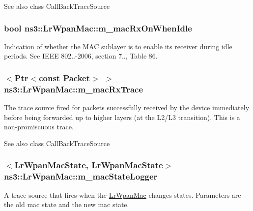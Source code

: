 \begin{DoxySeeAlso}{See also}
class Call\+Back\+Trace\+Source 
\end{DoxySeeAlso}
\subsubsection[{\texorpdfstring{m\+\_\+mac\+Rx\+On\+When\+Idle}{m_macRxOnWhenIdle}}]{\setlength{\rightskip}{0pt plus 5cm}bool ns3\+::\+Lr\+Wpan\+Mac\+::m\+\_\+mac\+Rx\+On\+When\+Idle}\hypertarget{classns3_1_1LrWpanMac_a0e100f9e642d0adce0e0a29384c535fc}{}\label{classns3_1_1LrWpanMac_a0e100f9e642d0adce0e0a29384c535fc}
Indication of whether the M\+AC sublayer is to enable its receiver during idle periods. See I\+E\+EE 802..-\/2006, section 7.., Table 86. 
\subsubsection[{\texorpdfstring{m\+\_\+mac\+Rx\+Trace}{m_macRxTrace}}]{$<${\bf Ptr}$<$const {\bf Packet}$>$ $>$ ns3\+::\+Lr\+Wpan\+Mac\+::m\+\_\+mac\+Rx\+Trace\hspace{0.3cm}{\ttfamily [private]}}\hypertarget{classns3_1_1LrWpanMac_a38183ee976b61d2c93942250f5670b7c}{}\label{classns3_1_1LrWpanMac_a38183ee976b61d2c93942250f5670b7c}
The trace source fired for packets successfully received by the device immediately before being forwarded up to higher layers (at the L2/\+L3 transition). This is a non-\/promiscuous trace.

\begin{DoxySeeAlso}{See also}
class Call\+Back\+Trace\+Source 
\end{DoxySeeAlso}
\subsubsection[{\texorpdfstring{m\+\_\+mac\+State\+Logger}{m_macStateLogger}}]{$<${\bf Lr\+Wpan\+Mac\+State}, {\bf Lr\+Wpan\+Mac\+State}$>$ ns3\+::\+Lr\+Wpan\+Mac\+::m\+\_\+mac\+State\+Logger\hspace{0.3cm}{\ttfamily [private]}}\hypertarget{classns3_1_1LrWpanMac_a7545ecfb4bdf7436739d00507872d248}{}\label{classns3_1_1LrWpanMac_a7545ecfb4bdf7436739d00507872d248}
A trace source that fires when the \hyperlink{classns3_1_1LrWpanMac}{Lr\+Wpan\+Mac} changes states. Parameters are the old mac state and the new mac state.

